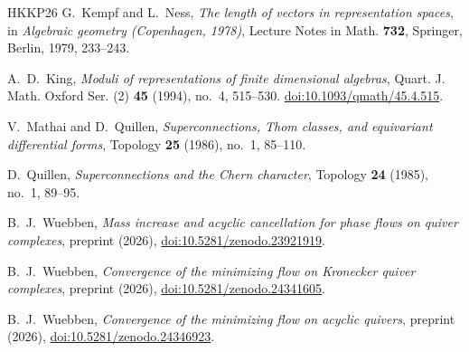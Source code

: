 \begin{thebibliography}{HKKP26}
G.~Kempf and L.~Ness,
\textit{The length of vectors in representation spaces},
in \textit{Algebraic geometry (Copenhagen, 1978)},
Lecture Notes in Math. \textbf{732}, Springer, Berlin, 1979, 233--243.

A.~D.~King,
\textit{Moduli of representations of finite dimensional algebras},
Quart. J. Math. Oxford Ser. (2) \textbf{45} (1994), no.~4, 515--530.
\href{https://doi.org/10.1093/qmath/45.4.515}{doi:10.1093/qmath/45.4.515}.

V.~Mathai and D.~Quillen,
\textit{Superconnections, Thom classes, and equivariant differential forms},
Topology \textbf{25} (1986), no.~1, 85--110.

D.~Quillen,
\textit{Superconnections and the Chern character},
Topology \textbf{24} (1985), no.~1, 89--95.

B.~J.~Wuebben,
\textit{Mass increase and acyclic cancellation for phase flows on quiver
complexes},
preprint (2026),
\href{https://doi.org/10.5281/zenodo.23921919}{doi:10.5281/zenodo.23921919}.

B.~J.~Wuebben,
\textit{Convergence of the minimizing flow on Kronecker quiver complexes},
preprint (2026), \href{https://doi.org/10.5281/zenodo.24341605}{doi:10.5281/zenodo.24341605}.

B.~J.~Wuebben,
\textit{Convergence of the minimizing flow on acyclic quivers},
preprint (2026), \href{https://doi.org/10.5281/zenodo.24346923}{doi:10.5281/zenodo.24346923}.

\end{thebibliography}
